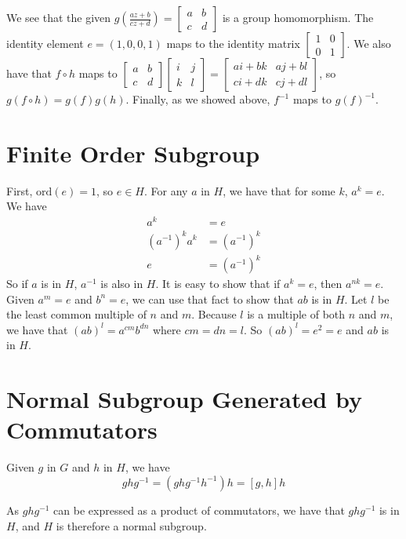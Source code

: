 \documentclass[12pt]{article}
\newcommand*{\ord}{\mathrm{ord}}
\newcommand*{\inv}{^{-1}}
\begin{document}
We see that the given $g(\frac{az + b}{cz + d}) = \begin{bmatrix} a & b\\ c & d \end{bmatrix}$ is a group homomorphism. The identity element $e = (1,0,0,1)$ maps to the identity matrix $\begin{bmatrix} 1 & 0\\ 0 & 1 \end{bmatrix}$. We also have that $f \circ h$ maps to $\begin{bmatrix} a & b\\ c & d \end{bmatrix}\begin{bmatrix} i & j\\ k & l \end{bmatrix} = \begin{bmatrix} ai + bk & aj + bl\\ ci + dk & cj + dl \end{bmatrix}$, so $g(f \circ h) = g(f)g(h)$. Finally, as we showed above, $f\inv$ maps to $g(f)\inv$.

\section{Finite Order Subgroup}
First, $\ord(e) = 1$, so $e \in H$. For any $a$ in $H$, we have that for some $k$, $a^k = e$. We have
\begin{align*}
a^k &= e\\
(a\inv)^k a^k &= (a\inv)^k\\
e &= (a\inv)^k
\end{align*}
So if $a$ is in $H$, $a\inv$ is also in $H$. It is easy to show that if $a^k = e$, then $a^{nk} = e$. Given $a^m = e$ and $b^n = e$, we can use that fact to show that $ab$ is in $H$. Let $l$ be the least common multiple of $n$ and $m$. Because $l$ is a multiple of both $n$ and $m$, we have that $(ab)^l = a^{cm}b^{dn}$ where $cm = dn = l$. So $(ab)^l = e^2 = e$ and $ab$ is in $H$.


\section{Normal Subgroup Generated by Commutators}
Given $g$ in $G$ and $h$ in $H$, we have
\[
g h g\inv = (g h g\inv h \inv) h = [g, h] h
\]

As $g h g\inv$ can be expressed as a product of commutators, we have that $g h g\inv$ is in $H$, and $H$ is therefore a normal subgroup.
\end{document}
